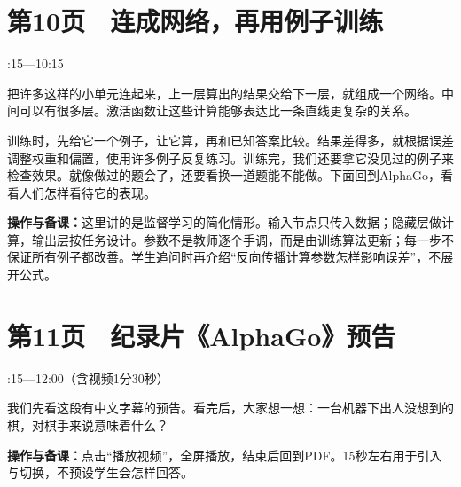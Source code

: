 \documentclass[UTF8,a4paper,11pt,fontset=fandol]{ctexart}
\newcommand{\tip}[1]{\par{\small\color{black!65}\noindent\textbf{操作与备课：}#1\par}}
\begin{document}
\par\noindent\begin{minipage}{\linewidth}

\section*{第10页　连成网络，再用例子训练}

{\small{}:15—10:15\par}

把许多这样的小单元连起来，上一层算出的结果交给下一层，就组成一个网络。中间可以有很多层。激活函数让这些计算能够表达比一条直线更复杂的关系。

训练时，先给它一个例子，让它算，再和已知答案比较。结果差得多，就根据误差调整权重和偏置，使用许多例子反复练习。训练完，我们还要拿它没见过的例子来检查效果。就像做过的题会了，还要看换一道题能不能做。下面回到AlphaGo，看看人们怎样看待它的表现。

\tip{这里讲的是监督学习的简化情形。输入节点只传入数据；隐藏层做计算，输出层按任务设计。参数不是教师逐个手调，而是由训练算法更新；每一步不保证所有例子都改善。学生追问时再介绍“反向传播计算参数怎样影响误差”，不展开公式。}

\end{minipage}\par\vspace{2mm}

\par\noindent\begin{minipage}{\linewidth}

\section*{第11页　纪录片《AlphaGo》预告}

{\small{}:15—12:00（含视频1分30秒）\par}

我们先看这段有中文字幕的预告。看完后，大家想一想：一台机器下出人没想到的棋，对棋手来说意味着什么？

\tip{点击“播放视频”，全屏播放，结束后回到PDF。15秒左右用于引入与切换，不预设学生会怎样回答。}

\end{minipage}\par\vspace{2mm}
\end{document}
